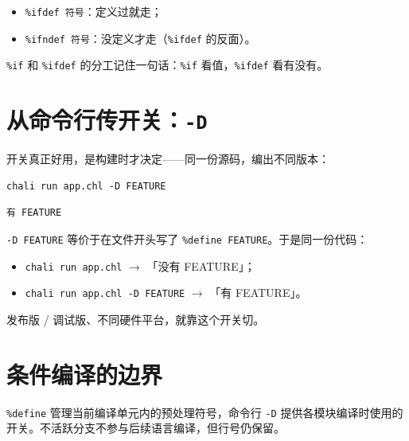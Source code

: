 \begin{itemize}

\item \texttt{\%ifdef 符号}：定义过就走；

\item \texttt{\%ifndef 符号}：没定义才走（\texttt{\%ifdef} 的反面）。

\end{itemize}

\texttt{\%if} 和 \texttt{\%ifdef} 的分工记住一句话：\texttt{\%if} 看值，\texttt{\%ifdef} 看有没有。

\section{从命令行传开关：\texttt{-D}}

开关真正好用，是构建时才决定——同一份源码，编出不同版本：

\par
\medskip
\begin{lstlisting}[style=sh]
chali run app.chl -D FEATURE
\end{lstlisting}
\par
\medskip

\par
\medskip
\begin{lstlisting}[style=out]
有 FEATURE
\end{lstlisting}
\par
\medskip

\texttt{-D FEATURE} 等价于在文件开头写了 \texttt{\%define FEATURE}。于是同一份代码：

\begin{itemize}

\item \texttt{chali run app.\allowbreak{}chl} \ensuremath{\rightarrow} 「没有 FEATURE」；

\item \texttt{chali run app.\allowbreak{}chl -D FEATURE} \ensuremath{\rightarrow} 「有 FEATURE」。

\end{itemize}

发布版 / 调试版、不同硬件平台，就靠这个开关切。

\section{条件编译的边界}

\texttt{\%define} 管理当前编译单元内的预处理符号，命令行 \texttt{-D} 提供各模块编译时使用的开关。不活跃分支不参与后续语言编译，但行号仍保留。

